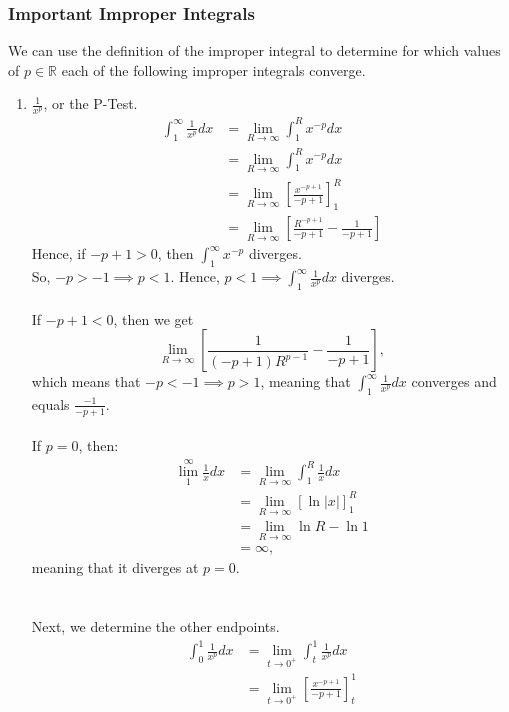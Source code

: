 \documentclass{article}
\begin{document}
\subsubsection{Important Improper Integrals}
We can use the definition of the improper integral to determine for which values of $p \in \mathbb{R}$ each of the following improper integrals converge.
\begin{enumerate}
    \item $\frac{1}{x^p}$, or the P-Test.
    \begin{align*}
        \int_1^\infty \frac{1}{x^p} dx & = \lim_{R\to\infty}\int_1^R x^{-p} dx\\
        & = \lim_{R\to\infty} \int_1^R x^{-p} dx\\
        & = \lim_{R\to\infty} \left[ \frac{x^{-p+1}}{-p + 1}\right]_1^R\\
        & = \lim_{R\to\infty} \left[ \frac{R^{-p+1}}{-p+1} - \frac{1}{-p+1}\right]
    \end{align*}
    Hence, if $-p+1 > 0$, then $\int_1^\infty x^{-p}$ diverges.\\
    So, $-p > -1 \implies p<1$. Hence, $p<1 \implies \int_1^\infty \frac{1}{x^p} dx$ diverges.\\
    \\
    If $-p + 1 < 0$, then we get $$\lim_{R\to\infty}\left[\frac{1}{(-p+1)R^{p-1}} - \frac{1}{-p+1}\right],$$
    which means that $-p < -1 \implies p >1$, meaning that $\int_1^\infty \frac{1}{x^p} dx$ converges and equals $\frac{-1}{-p+1}$.\\
    \\
    If $p = 0$, then:
    \begin{align*}
        \lim_1^\infty \frac{1}{x} dx & = \lim_{R\to\infty} \int_1^R \frac{1}{x} dx\\
        & = \lim_{R\to\infty} [\ln|x|]_1^R\\
        & = \lim_{R\to\infty} \ln R - \ln 1\\
        & = \infty,
    \end{align*}
    meaning that it diverges at $p = 0$.\\
    \\\\
    Next, we determine the other endpoints.
    \begin{align*}
        \int_0^1 \frac{1}{x^p} dx & = \lim_{t\to 0^+} \int_t^1 \frac{1}{x^p} dx\\
        & = \lim_{t\to0^+} \left[\frac{x^{-p+1}}{-p+1}\right]_t^1\\

\end{align*}
\end{enumerate}
\end{document}
